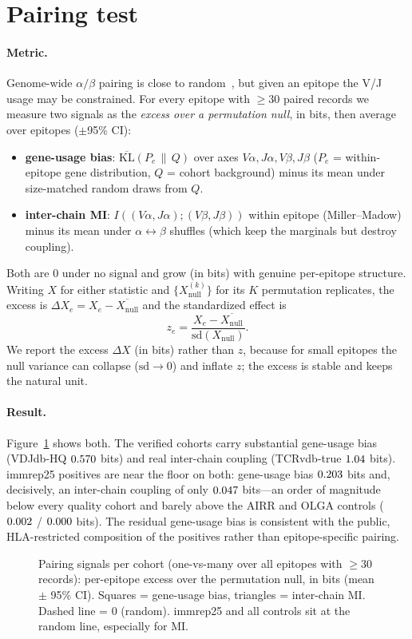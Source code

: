 \section{Pairing test}\label{sec:pairing}

\paragraph{Metric.} Genome-wide $\alpha/\beta$ pairing is close to
random~\cite{Shcherbinin_2020}, but given an epitope the V/J usage may be constrained.
For every epitope with $\ge 30$ paired records we measure two signals as the
\emph{excess over a permutation null}, in bits, then average over epitopes
($\pm$95\% CI):
\begin{itemize}\itemsep2pt
\item \textbf{gene-usage bias}: $\overline{\mathrm{KL}}(P_e\,\|\,Q)$ over axes
  $V\alpha,J\alpha,V\beta,J\beta$ ($P_e$ = within-epitope gene distribution, $Q$ =
  cohort background) minus its mean under size-matched random draws from $Q$.
\item \textbf{inter-chain MI}: $I\!\left((V\alpha,J\alpha);(V\beta,J\beta)\right)$
  within epitope (Miller--Madow) minus its mean under $\alpha\!\leftrightarrow\!\beta$
  shuffles (which keep the marginals but destroy coupling).
\end{itemize}
Both are $0$ under no signal and grow (in bits) with genuine per-epitope structure.
Writing $X$ for either statistic and $\{X^{(k)}_{\text{null}}\}$ for its $K$
permutation replicates, the excess is $\Delta X_e = X_e-\overline{X^{}_{\text{null}}}$
and the standardized effect is
\[
z_e=\frac{X_e-\overline{X_{\text{null}}}}{\mathrm{sd}(X_{\text{null}})}.
\]
We report the excess $\Delta X$ (in bits) rather than $z$, because for small epitopes
the null variance can collapse ($\mathrm{sd}\to 0$) and inflate $z$; the excess is
stable and keeps the natural unit.

\paragraph{Result.} Figure~\ref{fig:pair} shows both. The verified cohorts carry
substantial gene-usage bias (VDJdb-HQ $0.570$ bits) and real inter-chain coupling
(TCRvdb-true $1.04$ bits). immrep25 positives are near the floor on both:
gene-usage bias $0.203$ bits and, decisively, an inter-chain coupling of only
$0.047$ bits---an order of magnitude below every quality cohort and barely above the
AIRR and OLGA controls ($0.002$ / $0.000$ bits). The residual gene-usage bias is
consistent with the public, HLA-restricted composition of the positives rather than
epitope-specific pairing.

\begin{figure}[h]\centering

\caption{Pairing signals per cohort (one-vs-many over all epitopes with $\ge 30$
records): per-epitope excess over the permutation null, in bits (mean $\pm$ 95\% CI).
Squares = gene-usage bias, triangles = inter-chain MI. Dashed line = $0$ (random).
immrep25 and all controls sit at the random line, especially for MI.}
\label{fig:pair}
\end{figure}
